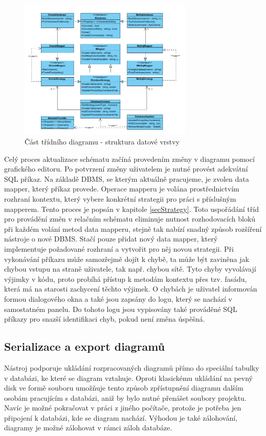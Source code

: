 \documentclass[czech,bachelor,public,dept460,male,oneside]{diploma}
\begin{document}
	\begin{figure}[!h]
		\centering
		\includegraphics[width=0.74\textwidth]{Figures/EditorSync}
		\caption{Část třídního diagramu - struktura datové vrstvy}
		\label{fig:classDiagSync}
	\end{figure}
	
	Celý proces aktualizace schématu začíná provedením změny v diagramu pomocí grafického editoru. Po potvrzení změny uživatelem je nutné provést adekvátní SQL příkaz. Na základě DBMS, se kterým aktuálně pracujeme, je zvolen data mapper, který příkaz provede. Operace mapperu je volána prostřednictvím rozhraní kontextu, který vybere konkrétní strategii pro práci s příslušným mapperem. Tento proces je popsán v kapitole \ref{secStrategy}. Toto uspořádání tříd pro provádění změn v relačním schématu eliminuje nutnost rozhodovacích bloků při každém volání metod data mapperu, stejně tak nabízí snadný způsob rozšíření nástroje o nové DBMS. Stačí pouze přidat nový data mapper, který implementuje požadované rozhraní a vytvořit pro něj novou strategii. Při vykonávání příkazu může samozřejmě dojít k chybě, ta může být zaviněna jak chybou vstupu na straně uživatele, tak např. chybou sítě. Tyto chyby vyvolávají výjimky v kódu, proto probíhá přístup k metodám kontextu přes tzv. fasádu, která má na starosti zachycení těchto výjimek. O chybách je uživatel informován formou dialogového okna a také jsou zapsány do logu, který se nachází v samostatném panelu. Do tohoto logu jsou vypisovány také prováděné SQL příkazy pro snazší identifikaci chyb, pokud není změna úspěšná.
	
	\subsection{Serializace a export diagramů}
	Nástroj podporuje ukládání rozpracovaných diagramů přímo do speciální tabulky v databázi, ke které se diagram vztahuje. Oproti klasickému ukládání na pevný disk ve formě souboru umožňuje tento způsob zpřístupnění diagramu dalším osobám pracujícím s databázi, aniž by bylo nutné přenášet soubory projektu. Navíc je možné pokračovat v práci z jiného počítače, protože je potřeba jen připojení k databázi, kde se diagram nachází. Výhodou je také zálohování, diagramy je možné zálohovat v rámci záloh databáze.
	
\end{document}
